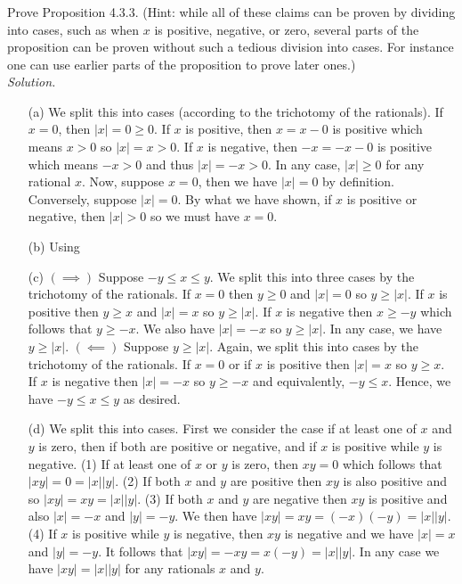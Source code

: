 \documentclass{amsart}
\theoremstyle{definition}
\newcommand{\soln}{\newline\textit{Solution.} }
\begin{document}
\subsubsection{} Prove Proposition 4.3.3. (Hint: while all of these claims can be proven by dividing into cases, such as when $x$ is positive, negative, or zero, several parts of the proposition can be proven without such a tedious division into cases. For instance one can use earlier parts of the proposition to prove later ones.) \\
\soln 
\begin{enumerate}
\item[(a)] We split this into cases (according to the trichotomy of the rationals). If $x=0$, then $|x|=0\geq 0$. If $x$ is positive, then $x=x-0$ is positive which means $x>0$ so $|x|=x>0$. If $x$ is negative, then $-x=-x-0$ is positive which means $-x>0$ and thus $|x|=-x>0$. In any case, $|x|\geq 0$ for any rational $x$. 
Now, suppose $x=0$, then we have $|x|=0$ by definition. Conversely, suppose $|x|=0$. By what we have shown, if $x$ is positive or negative, then $|x|>0$ so we must have $x=0$. 
\item[(b)] Using 
\item[(c)] $(\implies)$ Suppose $-y\leq x\leq y$. We split this into three cases by the trichotomy of the rationals. If $x=0$ then $y\geq 0$ and $|x|=0$ so $y\geq |x|$. If $x$ is positive then $y\geq x$ and $|x|=x$ so $y\geq |x|$. If $x$ is negative then $x\geq -y$ which follows that $y\geq -x$. We also have $|x|=-x$ so $y\geq |x|$. In any case, we have $y\geq |x|$. $(\impliedby)$ Suppose $y\geq |x|$. Again, we split this into cases by the trichotomy of the rationals. If $x=0$ or if $x$ is positive then $|x|=x$ so $y\geq x$. If $x$ is negative then $|x|=-x$ so $y\geq -x$ and equivalently, $-y\leq x$. Hence, we have $-y\leq x\leq y$ as desired.
\item[(d)] We split this into cases. First we consider the case if at least one of $x$ and $y$ is zero, then if both are positive or negative, and if $x$ is positive while $y$ is negative. (1) If at least one of $x$ or $y$ is zero, then $xy=0$ which follows that $|xy|=0=|x||y|$. (2) If both $x$ and $y$ are positive then $xy$ is also positive and so $|xy|=xy=|x||y|$. (3) If both $x$ and $y$ are negative then $xy$ is positive and also $|x|=-x$ and $|y|=-y$. We then have $|xy|=xy=(-x)(-y)=|x||y|$. (4) If $x$ is positive while $y$ is negative, then $xy$ is negative and we have $|x|=x$ and $|y|=-y$. It follows that $|xy|=-xy=x(-y)=|x||y|$. In any case we have $|xy|=|x||y|$ for any rationals $x$ and $y$.

\end{enumerate}
\end{document}
